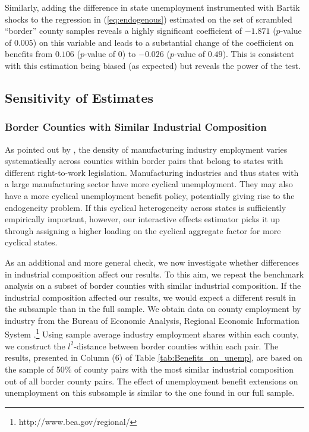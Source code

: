 \documentclass[12pt]{article}
\newcommand{\1}{\mathbf{1}}
\begin{document}
Similarly, adding the difference in state unemployment instrumented with Bartik shocks to the regression in (\ref{eq:endogenous}) estimated on the set of scrambled  ``border'' county samples reveals a highly significant coefficient of $-1.871$ ($p$-value of $0.005$) on this variable and leads to a substantial change of the coefficient on benefits from $0.106$ ($p$-value of $0$) to $-0.026$ ($p$-value of $0.49$). This is consistent with this estimation being biased (as expected) but reveals the power of the test.







\subsection{Sensitivity of Estimates}


\subsubsection{Border Counties with Similar Industrial Composition}
As pointed out by \citet{holmes:98}, the density of manufacturing industry employment varies systematically across counties within border pairs that belong to states with different right-to-work legislation. Manufacturing industries and thus states with a large manufacturing sector have more cyclical unemployment. They may also have a more cyclical unemployment benefit policy, potentially giving rise to the endogeneity problem. If this cyclical heterogeneity across states is sufficiently empirically important, however, our interactive effects estimator picks it up through assigning a higher loading on the cyclical aggregate factor for more cyclical states.

As an additional and more general check, we now investigate whether differences in industrial composition affect our results. To this aim, we repeat the benchmark analysis on a subset of border counties with similar industrial composition.  If the industrial composition affected our results, we would expect a different result in the subsample than in the full sample. We obtain data on county employment by industry from the Bureau of Economic Analysis, Regional Economic Information System \citep{data:bea-ca25n}.\footnote{http://www.bea.gov/regional/}  Using sample average industry employment shares within each county, we construct the $l^2$-distance between border counties within each pair. The results, presented in Column (6) of Table \ref{tab:Benefits_on_unemp}, are based on the sample of 50\% of county pairs with the most similar industrial composition out of all border county pairs. The effect of unemployment benefit extensions on unemployment on this subsample is similar to the one found in our full sample.
\end{document}
